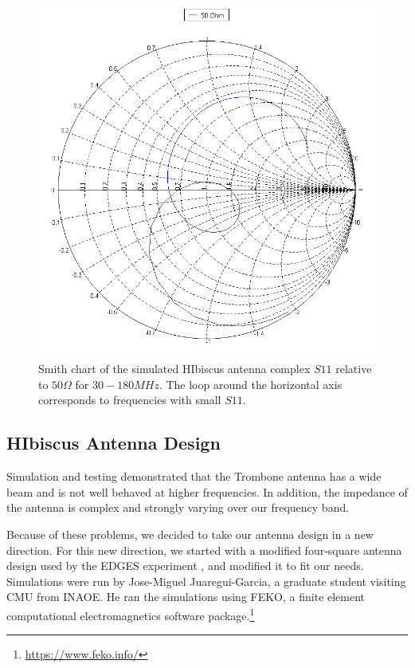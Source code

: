 \begin{figure}[htb]
\begin{minipage}[b]{0.46\textwidth}
\includegraphics[width=0.95\linewidth]{SCIHI_system/figures/HIbiscus_S11_50_Smith.png}
\caption{Smith chart of the simulated HIbiscus antenna complex $S11$ relative to $50 \Omega$ for $30 - 180 MHz$. The loop around the horizontal axis corresponds to frequencies with small $S11$. }
\label{Fig:HIsim_S11_Smith}
\end{minipage}
\end{figure}


\subsection{HIbiscus Antenna Design}

Simulation and testing demonstrated that the Trombone antenna has a wide beam and is not well behaved at higher frequencies. In addition, the impedance of the antenna is complex and strongly varying over our frequency band. 

Because of these problems, we decided to take our antenna design in a new direction. For this new direction, we started with a modified four-square antenna design used by the EDGES experiment \cite{bowman_2008}\cite{rogers_2008}, and modified it to fit our needs. Simulations were run by Jose-Miguel Juaregui-Garcia, a graduate student visiting CMU from INAOE. He ran the simulations using FEKO, a finite element computational electromagnetics software package.\footnote{\url{https://www.feko.info/}} 

